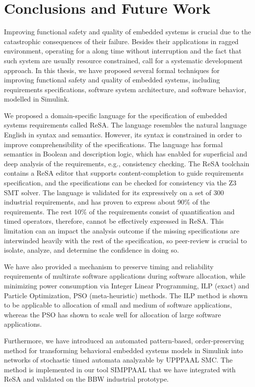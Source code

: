\chapter{Conclusions and Future Work}
Improving functional safety and quality of embedded systems is crucial due to the catastrophic consequences of their failure. Besides their applications in ragged environment, operating for a along time without interruption and the fact that such system are usually resource constrained, call for a systematic development approach. In this thesis, we have proposed several formal techniques for improving functional safety and quality of embedded systems, including requirements specifications, software system architecture, and software behavior, modelled in Simulink.

We proposed a domain-specific language for the specification of embedded systems requirements called ReSA. The language resembles the natural language English in syntax and semantics. However, its syntax is constrained in order to improve comprehensibility of the specifications. The language has formal semantics in Boolean and description logic, which has enabled for superficial and deep analysis of the requirements, e.g., consistency checking. The ReSA toolchain contains a ReSA editor that supports content-completion to guide requirements specification, and the specifications can be checked for consistency via the Z3 SMT solver. The language is validated for its expressively on a set of 300 industrial requirements, and has proven to express about 90\% of the requirements. The rest 10\% of the requirements consist of quantification and timed operators, therefore, cannot be effectively expressed in ReSA. This limitation can an impact the analysis outcome if the missing specifications are interwinded heavily with the rest of the specification, so peer-review is crucial to isolate, analyze, and determine the confidence in doing so.

We have also provided a mechanism to preserve timing and reliability requirements of multirate software applications during software allocation, while minimizing power consumption via Integer Linear Programming, ILP (exact) and Particle Optimization, PSO (meta-heuristic) methods. The ILP method is shown to be applicable to allocation of small and medium of software applications, whereas the PSO has shown to scale well for allocation of large software applications.

Furthermore, we have introduced an automated pattern-based, order-preserving method for transforming behavioral embedded systems models in Simulink into networks of stochastic timed automata analyzable by UPPPAAL SMC. The method is implemented in our tool SIMPPAAL that we have integrated with ReSA and validated on the BBW industrial prototype. 

